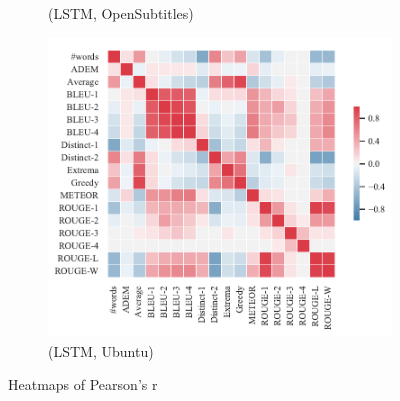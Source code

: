 \begin{figure}[htbp]
\begin{subfigure}{0.35\linewidth}
        \caption{(LSTM, OpenSubtitles)}
    \end{subfigure}%
    \begin{subfigure}{0.35\linewidth}
        \centering
        \includegraphics[width=\linewidth]{figure/plot/heatmap/v4/pearson/lstm/ubuntu/plot.pdf}
        \caption{(LSTM, Ubuntu)}
    \end{subfigure}
    \caption{Heatmaps of Pearson's r}
    \label{fig:corr_heatmap}
\end{figure}
